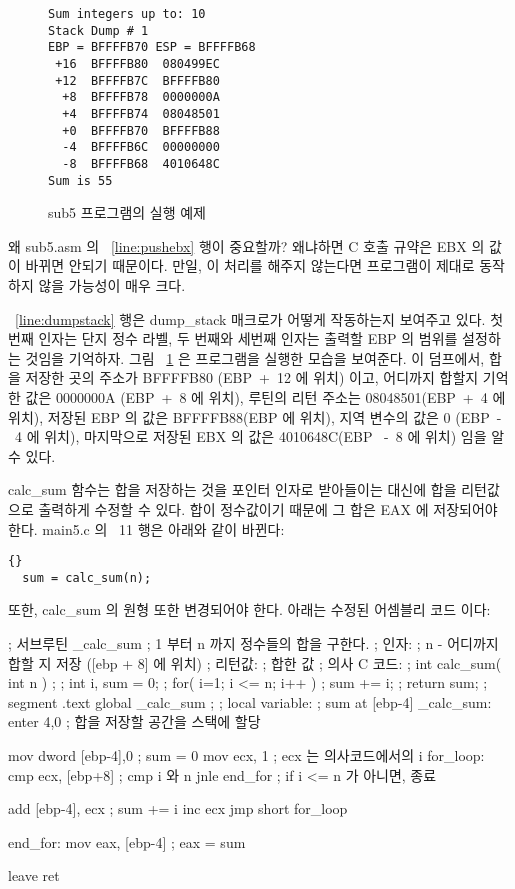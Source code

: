 \begin{figure}[t]
\begin{Verbatim}[frame=single]
Sum integers up to: 10
Stack Dump # 1
EBP = BFFFFB70 ESP = BFFFFB68
 +16  BFFFFB80  080499EC
 +12  BFFFFB7C  BFFFFB80
  +8  BFFFFB78  0000000A
  +4  BFFFFB74  08048501
  +0  BFFFFB70  BFFFFB88
  -4  BFFFFB6C  00000000
  -8  BFFFFB68  4010648C
Sum is 55
\end{Verbatim}
\caption{sub5 프로그램의 실행 예제 \label{fig:dumpstack}}
\end{figure}

왜 {\code sub5.asm} 의 ~\ref{line:pushebx} 행이 중요할까? 왜냐하면 C 호출 규약은
EBX 의 값이 바뀌면 안되기 때문이다. 만일, 이 처리를 해주지
않는다면 프로그램이 제대로 동작하지 않을 가능성이 매우 크다. 

~\ref{line:dumpstack} 행은 {\code dump\_stack} 매크로가 어떻게 작동하는지 보여주고 있다.
첫 번째 인자는 단지 정수 라벨, 두 번째와 세번째 인자는 출력할 EBP 의 범위를 설정하는 것임을
기억하자. 그림 ~\ref{fig:dumpstack} 은 프로그램을 실행한 모습을 보여준다. 이 덤프에서, 합을
저장한 곳의 주소가 BFFFFB80 (EBP~+~12 에 위치) 이고, 어디까지 합할지 기억한 값은 
0000000A (EBP~+~8 에 위치), 루틴의 리턴 주소는 08048501(EBP~+~4 에 위치), 
저장된 EBP 의 값은 BFFFFB88(EBP 에 위치), 지역 변수의 값은 0 (EBP~-~4 에 위치), 
마지막으로 저장된 EBX 의 값은 4010648C(EBP ~-~8 에 위치) 임을 알 수 있다. 

{\code calc\_sum} 함수는 합을 저장하는 것을 포인터 인자로 받아들이는 대신에 
합을 리턴값으로 출력하게 수정할 수 있다. 합이 정수값이기 때문에 그 합은 EAX 에 저장되어야 한다. 
{\code main5.c} 의 ~11 행은 아래와 같이 바뀐다:

\begin{lstlisting}[stepnumber=0]{}
  sum = calc_sum(n);
\end{lstlisting}
또한, {\code calc\_sum} 의 원형 또한 변경되어야 한다. 아래는 수정된
어셈블리 코드 이다:
\begin{AsmCodeListing}[label=sub6.asm]
; 서브루틴 _calc_sum
; 1 부터 n 까지 정수들의 합을 구한다. 
; 인자:
;   n    - 어디까지 합할 지 저장 ([ebp + 8] 에 위치)
; 리턴값:
;   합한 값
; 의사 C 코드:
; int calc_sum( int n )
; {
;   int i, sum = 0;
;   for( i=1; i <= n; i++ )
;     sum += i;
;   return sum;
; }
segment .text
        global  _calc_sum
;
; local variable:
;   sum at [ebp-4]
_calc_sum:
        enter   4,0               ; 합을 저장할 공간을 스택에 할당

        mov     dword [ebp-4],0   ; sum = 0
        mov     ecx, 1            ; ecx 는 의사코드에서의 i
for_loop:
        cmp     ecx, [ebp+8]      ; cmp i 와 n
        jnle    end_for           ; if i <= n 가 아니면, 종료

        add     [ebp-4], ecx      ; sum += i
        inc     ecx
        jmp     short for_loop

end_for:
        mov     eax, [ebp-4]      ; eax = sum

        leave
        ret
\end{AsmCodeListing}

